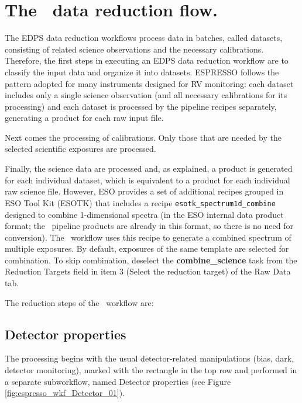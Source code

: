 \section{The \instname\ data reduction flow.}
\label{sec:reduction_flow}




The EDPS data reduction workflows process data in batches, called datasets, consisting of related science observations and the necessary calibrations. Therefore, the first steps in executing an EDPS data reduction workflow are to classify the input data and organize it into datasets. ESPRESSO follows the pattern adopted for many instruments designed for RV monitoring: each dataset includes only a single science observation (and all necessary calibrations for its processing) and each dataset is processed by the pipeline recipes separately, generating a product for each raw input file.

Next comes the processing of calibrations. Only those that are needed by the selected scientific exposures are processed.

Finally, the science data are processed and, as explained, a product is generated for each individual dataset, which is equivalent to a product for each individual raw science file. However, ESO provides a set of additional recipes grouped in ESO Tool Kit (ESOTK) that includes a recipe {\tt esotk\_spectrum1d\_combine} designed to combine 1-dimensional spectra (in the ESO internal data product format; the \instname\ pipeline products are already in this format, so there is no need for conversion). The  \wkfname\  workflow uses this recipe to generate a combined spectrum of multiple exposures.
By default, exposures of the same template are selected for combination. To skip combination, deselect the {\bf combine\_science} task from the Reduction Targets field in item 3 (Select the reduction target) of the Raw Data tab.  




The reduction steps of the  \wkfname\  workflow are:

\subsection{Detector properties}

The processing begins with the usual detector-related manipulations
(bias, dark, detector monitoring), marked with the rectangle in 
the top row and performed in a separate subworkflow, named Detector properties (see Figure \ref{fig:espresso_wkf_Detector_01}).



